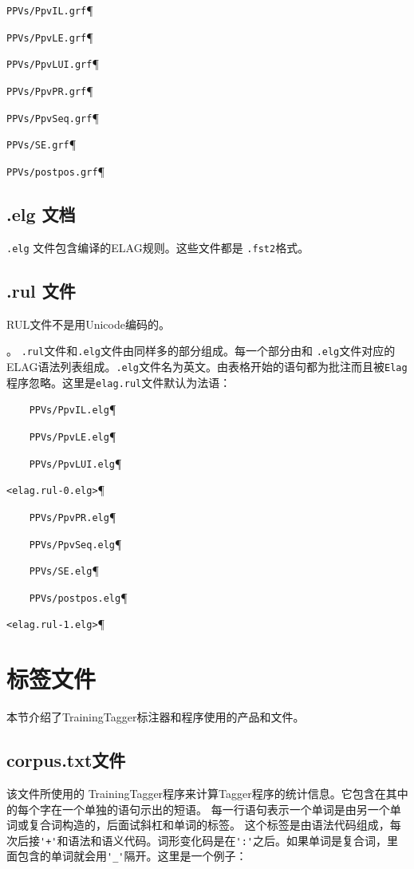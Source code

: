 \bigskip
\verb$PPVs/PpvIL.grf$\P

\verb$PPVs/PpvLE.grf$\P

\verb$PPVs/PpvLUI.grf$\P

\verb$PPVs/PpvPR.grf$\P

\verb$PPVs/PpvSeq.grf$\P

\verb$PPVs/SE.grf$\P

\verb$PPVs/postpos.grf$\P

\subsection{.elg 文档}
\verb$.elg$ 文件包含编译的ELAG规则。这些文件都是 \verb$.fst2$格式。



\subsection{ .rul 文件}
RUL文件不是用Unicode编码的。


\bigskip
{}。 \verb$.rul$文件和\verb$.elg$文件由同样多的部分组成。每一个部分由和 \verb$.elg$文件对应的ELAG语法列表组成。\verb$.elg$文件名为英文。由表格开始的语句都为批注而且被\verb+Elag+程序忽略。这里是\verb$elag.rul$文件默认为法语：

\bigskip
\verb$    PPVs/PpvIL.elg$\P

\verb$    PPVs/PpvLE.elg$\P

\verb$    PPVs/PpvLUI.elg$\P

\verb$<elag.rul-0.elg>$\P

\verb$    PPVs/PpvPR.elg$\P

\verb$    PPVs/PpvSeq.elg$\P

\verb$    PPVs/SE.elg$\P

\verb$    PPVs/postpos.elg$\P

\verb$<elag.rul-1.elg>$\P

\section{标签文件}
本节介绍了TrainingTagger标注器和程序使用的产品和文件。

\subsection{ corpus.txt文件}
\label{section-corpus-file}
该文件所使用的 TrainingTagger程序来计算Tagger程序的统计信息。它包含在其中的每个字在一个单独的语句示出的短语。
每一行语句表示一个单词是由另一个单词或复合词构造的，后面试斜杠和单词的标签。
这个标签是由语法代码组成，每次后接\verb$'+'$和语法和语义代码。词形变化码是在\verb+':'+之后。如果单词是复合词，里面包含的单词就会用\verb+'_'+隔开。这里是一个例子：


